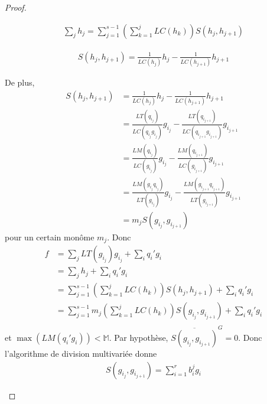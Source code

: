 \begin{proof}
\begin{enumerate}
                    \begin{align*}
                        \sum_j h_j = \sum_{j = 1}^{s-1} \left(\sum_{k = 1}^j LC(h_k) \right) S(h_j,h_{j+1})
                    \end{align*}
                    \begin{remq}
                        \begin{align*}
                            S(h_j, h_{j+1}) = \frac{1}{LC(h_j)}h_j - \frac{1}{LC(h_{j+1})}h_{j+1}
                        \end{align*}
                    \end{remq}
                    De plus,
                    \begin{align*}
                        S(h_j, h_{j+1}) &= \frac{1}{LC(h_j)}h_j - \frac{1}{LC(h_{j+1})}h_{j+1} \\
                        &= \frac{LT(q_{i_j})}{LC(q_{i_j}g_{i_j})}g_{i_j} - \frac{LT(q_{i_{j+1}})}{LC(q_{i_{j+1}}g_{i_{j+1}})}g_{i_{j+1}} \\
                        &= \frac{LM(q_{i_j})}{LC(g_{i_j})}g_{i_j} - \frac{LM(q_{i_{j+1}})}{LC(g_{i_{j+1}})}g_{i_{j+1}} \\
                        &= \frac{LM(g_{i_j}q_{i_j})}{LT(g_{i_j})}g_{i_j} - \frac{LM(g_{i_{j+1}}q_{i_{j+1}})}{LT(g_{i_{j+1}})}g_{i_{j+1}} \\
                        &= m_j S(g_{i_j}, g_{i_{j+1}})
                    \end{align*}
                    pour un certain monôme $m_j$. Donc
                    \begin{align*}
                        f &= \sum_j LT(g_{i_j})g_{i_j} + \sum_i q_i'g_i \\
                        &= \sum_j h_j + \sum_i q_i'g_i \\
                        &= \sum_{j = 1}^{s-1} \left(\sum_{k = 1}^j LC(h_k) \right) S(h_j,h_{j+1}) + \sum_i q_i'g_i \\
                        &= \sum_{j = 1}^{s-1} m_j \left(\sum_{k = 1}^j LC(h_k) \right) S(g_{i_j},g_{i_{j+1}}) + \sum_i q_i'g_i \\
                    \end{align*}
                    et $\max (LM(q_i'g_i)) < \mathbb{M}$. Par hypothèse, $\overline{S(g_{i_j}, g_{i_{j+1}})}^G = 0$. Donc l'algorithme de division multivariée donne 
                    \begin{align*}
                        S(g_{i_j}, g_{i_{j+1}}) = \sum_{i = 1}^r b_i^jg_i

\end{align*}
\end{enumerate}
\end{proof}
